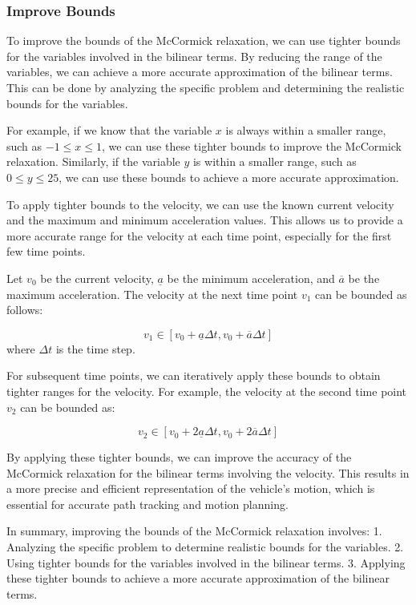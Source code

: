 \subsubsection{Improve Bounds}

To improve the bounds of the McCormick relaxation, we can use tighter bounds for the variables involved in the bilinear terms.
By reducing the range of the variables, we can achieve a more accurate approximation of the bilinear terms.
This can be done by analyzing the specific problem and determining the realistic bounds for the variables.

For example, if we know that the variable \( x \) is always within a smaller range, such as \( -1 \leq x \leq 1 \), we can use these tighter bounds
to improve the McCormick relaxation.
Similarly, if the variable \( y \) is within a smaller range, such as \( 0 \leq y \leq 25 \), we can use these bounds to achieve a more accurate
approximation.

To apply tighter bounds to the velocity, we can use the known current velocity and the maximum and minimum acceleration values.
This allows us to provide a more accurate range for the velocity at each time point, especially for the first few time points.

Let \( v_0 \) be the current velocity, \( \underline{a} \) be the minimum acceleration, and \( \overline{a} \) be the maximum acceleration.
The velocity at the next time point \( v_1 \) can be bounded as follows:

\[ v_1 \in [v_0 + \underline{a} \Delta t, v_0 +
		\overline{a} \Delta t] \] where \( \Delta t \) is the time step.

For subsequent time points, we can iteratively apply these bounds to obtain tighter ranges for the velocity.
For example, the velocity at the second time point \( v_2 \) can be bounded as:

\[ v_2 \in [v_0 + 2\underline{a} \Delta t, v_0 +
		2\overline{a} \Delta t] \]

By applying these tighter bounds, we can improve the accuracy of the McCormick relaxation for the
bilinear terms involving the velocity.
This results in a more precise and efficient representation of the vehicle's motion, which is essential for accurate path tracking and motion
planning.

In summary, improving the bounds of the McCormick relaxation involves: 1.
Analyzing the specific problem to determine realistic bounds for the variables.
2.
Using tighter bounds for the variables involved in the bilinear terms.
3.
Applying these tighter bounds to achieve a more accurate approximation of the bilinear terms.

